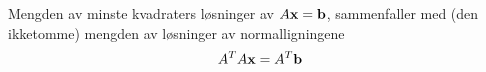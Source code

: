 Mengden av minste kvadraters løsninger av $A\mathbf{x}=\mathbf{b}$,
sammenfaller med (den ikketomme) mengden av løsninger av normalligningene
$$A^TA\mathbf{x} = A^T\mathbf{b}$$
